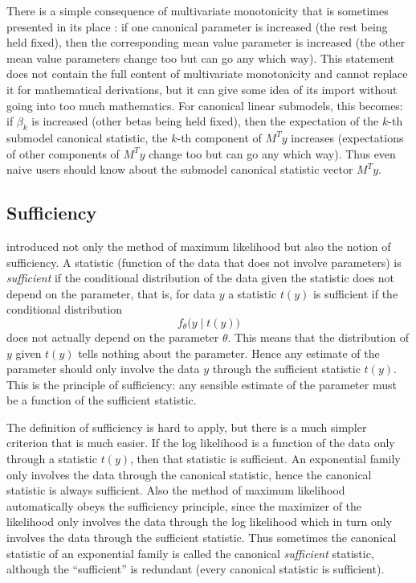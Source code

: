 \documentclass[11pt]{article}
\begin{document}
There is a simple consequence of multivariate monotonicity that is sometimes
presented in its place \citep[discussion section]{aster1}: if one canonical parameter is increased (the rest being held fixed), then the corresponding mean value
parameter is increased (the other mean value parameters change too but can go
any which way).  This statement does not contain the full content of
multivariate monotonicity and cannot replace it for mathematical derivations,
but it can give some idea of its import without going into too much mathematics.
For canonical linear submodels, this becomes: if $\beta_k$ is increased (other
betas being held fixed), then the expectation of the $k$-th submodel canonical
statistic, the $k$-th component of $M^T y$ increases (expectations of other
components of $M^T y$ change too but can go any which way).  Thus even naive
users should know about the submodel canonical statistic vector $M^T y$.

\subsection{Sufficiency} \label{sec:sufficient}

\citet{fisher1922} introduced not only the method of maximum likelihood but also
the notion of sufficiency.  A statistic (function of the data that does not
involve parameters) is \emph{sufficient} if the conditional distribution of
the data given the statistic does not depend on the parameter, that is,
for data $y$ a statistic $t(y)$ is sufficient if the conditional distribution
$$
   f_\theta\bigl(y \mid t(y)\bigr)
$$
does not actually depend on the parameter $\theta$.  This means that the
distribution of $y$ given $t(y)$ tells nothing about the parameter.  Hence
any estimate of the parameter should only involve the data $y$ through the
sufficient statistic $t(y)$.  This is the principle of sufficiency: any
sensible estimate of the parameter must be a function of the sufficient
statistic.

The definition of sufficiency is hard to apply, but there is a much simpler
criterion that is much easier.  If the log likelihood is a function
of the data only through a statistic $t(y)$, then that statistic is sufficient.
An exponential family only involves the data through the canonical statistic,
hence the canonical statistic is always sufficient.  Also the method of maximum
likelihood automatically obeys the sufficiency principle, since the maximizer
of the likelihood only involves the data through the log likelihood which
in turn only involves the data through the sufficient statistic.  Thus
sometimes the canonical statistic of an exponential family is called
the canonical \emph{sufficient} statistic, although the ``sufficient'' is
redundant (every canonical statistic is sufficient).
\end{document}
